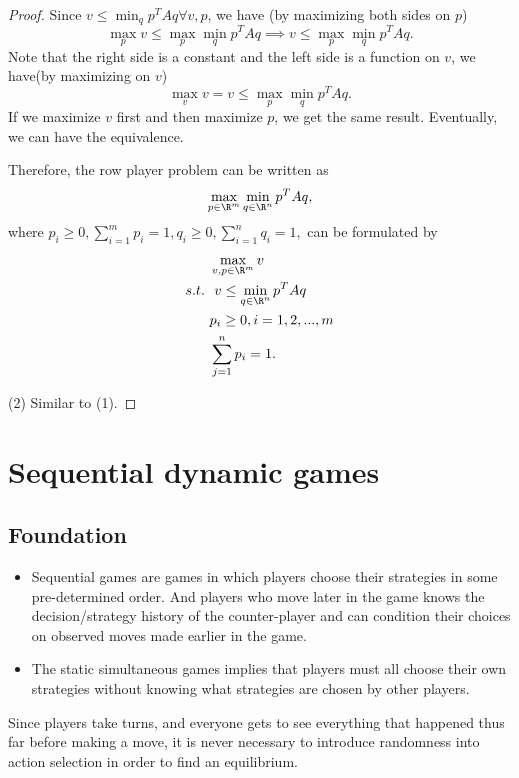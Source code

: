 \begin{refsection}
\begin{proof}
Since $v \leq \min_q p^TAq \forall v, p$, we have (by maximizing both sides on $p$)
$$\max_p v \leq \max_p \min_q p^TAq \implies v \leq \max_p \min_q p^TAq. $$
Note that the right side is a constant and the left side is a function on $v$, we have(by maximizing on $v$)
$$\max_v v = v \leq \max_p \min_q p^TAq.$$
If we maximize $v$ first and then maximize $p$, we get the same result. Eventually, we can have the equivalence.



Therefore, the row player problem can be written as
$$ \max_{p\in \R^m} \min_{q\in \R^n} p^TAq,$$
where $p_i \geq 0, \sum_{i=1}^m p_i = 1,q_i \geq 0, \sum_{i=1}^n q_i = 1,$
can be formulated by	
\begin{align*}
&\max_{v, p\in \R^m} v\\
s.t.~ &~ v \leq \min_{q\in \R^n} p^TAq\\
& p_i \geq 0, i=1,2,...,m\\
& \sum_{j=1}^n p_i = 1 .
\end{align*}

(2) Similar to (1).	
\end{proof}

\section{Sequential dynamic games}

\subsection{Foundation}
\begin{remark}\hfill
\begin{itemize}
	\item Sequential games are games in which players choose their strategies in some pre-determined order. And players who move later in the game knows the decision/strategy history of the counter-player and can condition their
	choices on observed moves made earlier in the game.
	\item The static simultaneous
	games implies that players must all choose their own strategies without knowing what strategies are chosen
	by other players.	
\end{itemize}		
\end{remark}


\begin{note}
Since players take
turns, and everyone gets to see everything that happened thus far before making a move, it is
never necessary to introduce randomness into action selection in order to find an equilibrium.	
\end{note}












\end{refsection}
